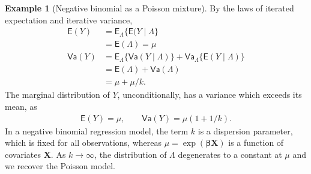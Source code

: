 \documentclass[
  11pt,
  letterpaper,
]{scrbook}
\theoremstyle{definition}
\theoremstyle{plain}
\theoremstyle{plain}
\theoremstyle{definition}
\newtheorem{example}{Example}[chapter]
\theoremstyle{definition}
\theoremstyle{remark}
\begin{document}
\begin{example}[Negative binomial as a Poisson
mixture]
By the laws of iterated expectation and iterative variance,
\begin{align*}
\mathsf{E}(Y) &= \mathsf{E}_{\Lambda}\{\mathsf{E}(Y \mid \Lambda\} \\& = \mathsf{E}(\Lambda) = \mu\\
\mathsf{Va}(Y) &= \mathsf{E}_{\Lambda}\{\mathsf{Va}(Y \mid \Lambda)\} + \mathsf{Va}_{\Lambda}\{\mathsf{E}(Y \mid \Lambda)\} \\&= \mathsf{E}(\Lambda) + \mathsf{Va}(\Lambda) \\&= \mu + \mu/k.
\end{align*} The marginal distribution of \(Y\), unconditionally, has a
variance which exceeds its mean, as \begin{align*}
\mathsf{E}(Y) = \mu, \qquad \mathsf{Va}(Y) = \mu (1+1/k).
\end{align*} In a negative binomial regression model, the term \(k\) is
a dispersion parameter, which is fixed for all observations, whereas
\(\mu = \exp(\boldsymbol{\beta}\mathbf{X})\) is a function of covariates
\(\mathbf{X}\). As \(k \to \infty\), the distribution of \(\Lambda\)
degenerates to a constant at \(\mu\) and we recover the Poisson model.

\end{example}
\end{document}
